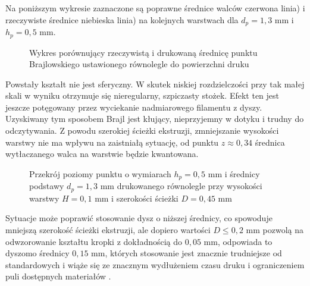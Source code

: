 \documentclass[12pt,a4paper]{article}
\begin{document}
Na poniższym wykresie zaznaczone są poprawne średnice walców czerwona linia) i rzeczywiste średnice niebieska linia) na kolejnych warstwach dla $d_p = 1{,}3 \text{ mm}$ i $h_p = 0{,}5 \text{ mm}$.

\begin{figure}
\caption{Wykres porównujący rzeczywistą i drukowaną średnicę punktu Brajlowskiego ustawionego równolegle do powierzchni druku}
\end{figure}

Powstały kształt nie jest sferyczny. W skutek niskiej rozdzielczości przy tak małej skali w wyniku otrzymuje się nieregularny, szpiczasty stożek. Efekt ten jest jeszcze potęgowany przez wyciekanie nadmiarowego filamentu z dyszy.
Uzyskiwany tym sposobem Brajl jest kłujący, nieprzyjemny w dotyku i trudny do odczytywania.
Z powodu szerokiej ścieżki ekstruzji, zmniejszanie wysokości warstwy nie ma wpływu na zaistniałą sytuację, od punktu $z \approx 0,34$ średnica wytłaczanego walca na warstwie będzie kwantowana.

\begin{figure}
\centering
{}
\caption{Przekrój poziomy punktu o wymiarach $h_p = 0{,}5 \text{ mm}$ i średnicy podstawy $d_p=1{,}3 \text{ mm}$ drukowanego równolegle przy wysokości warstwy $H = 0{,}1 \text{ mm}$ i szerokości ścieżki $D = 0{,}45 \text{ mm}$}
\end{figure}

Sytuacje może poprawić stosowanie dysz o niższej średnicy, co spowoduje mniejszą szerokość ścieżki ekstruzji, ale dopiero wartości $D \leq 0{,}2 \text{ mm}$ pozwolą na odwzorowanie kształtu kropki z dokładnością do $0{,}05 \text{ mm}$, odpowiada to dyszomo średnicy $0{,}15 \text{ mm}$, których stosowanie jest znacznie trudniejsze od standardowych i wiąże się ze znacznym wydłużeniem czasu druku i ograniczeniem puli dostępnych materiałów \cite{e3d15}.
\end{document}
